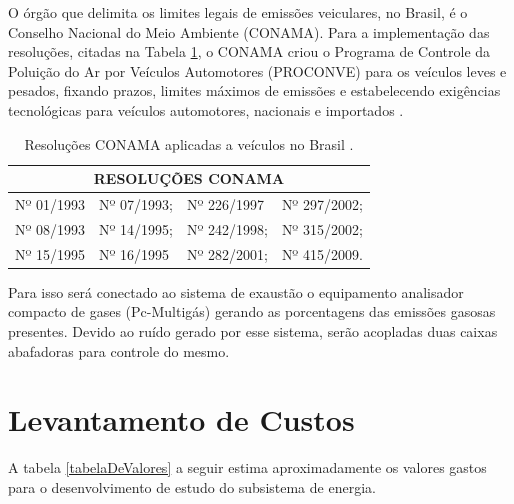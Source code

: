 O órgão que delimita os limites legais de emissões veiculares, no Brasil, é o Conselho Nacional do Meio Ambiente (CONAMA). Para a implementação das resoluções, citadas na Tabela \ref{resoluçõesConama}, o CONAMA criou o Programa de Controle da Poluição do Ar por Veículos Automotores (PROCONVE) para os veículos leves e pesados, fixando prazos, limites máximos de emissões e estabelecendo exigências tecnológicas para veículos automotores, nacionais e importados \cite{energiaAvaliacao}.

\begin{table}[h!]
	\centering
	\caption{Resoluções CONAMA aplicadas a veículos no Brasil \cite{energiaAvaliacao}.}
	\label{resoluçõesConama}
	\begin{tabular}{|l|l|l|l|}
		\hline
		\multicolumn{4}{|c|}{RESOLUÇÕES CONAMA} \\ \hline
		Nº 01/1993      & Nº 07/1993;      & Nº 226/1997     & Nº 297/2002;     \\ \hline
		Nº 08/1993      & Nº 14/1995;      & Nº 242/1998;     & Nº 315/2002;     \\ \hline
		Nº 15/1995      & Nº 16/1995      & Nº 282/2001;     & Nº 415/2009.     \\ \hline
	\end{tabular}
\end{table}

Para isso será conectado ao sistema de exaustão o equipamento analisador compacto de gases (Pc-Multigás) gerando as porcentagens das emissões gasosas presentes. Devido ao ruído gerado por esse sistema, serão acopladas duas caixas abafadoras para controle do mesmo.

\section{Levantamento de Custos}

A tabela \ref{tabelaDeValores} a seguir estima aproximadamente os valores gastos para o desenvolvimento de estudo do subsistema de energia.

